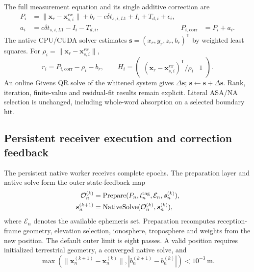 The full measurement equation and its single additive correction are
\begin{align}
 P_i&=\|\boldsymbol x_r-\boldsymbol x_{s,i}^{rx}\|+b_r
       -c\delta t_{s,i,L1}+I_i+T_{d,i}+\epsilon_i,\\
 a_i&=c\delta t_{s,i,L1}-I_i-T_{d,i},
 &P_{i,\mathrm{corr}}&=P_i+a_i.
 \label{eq:live-corrected-code}
\end{align}
The native CPU/CUDA solver estimates
$\boldsymbol s=(x_r,y_r,z_r,b_r)^\mathsf T$ by weighted least squares. For
$\rho_i=\|\boldsymbol x_r-\boldsymbol x_{s,i}^{rx}\|$,
\begin{equation}
 r_i=P_{i,\mathrm{corr}}-\rho_i-b_r,
 \qquad
 H_i=\begin{pmatrix}
 (\boldsymbol x_r-\boldsymbol x_{s,i}^{rx})^\mathsf T/\rho_i&1
 \end{pmatrix}.
\end{equation}
An online Givens QR solve of the whitened system gives $\Delta\boldsymbol s$;
$\boldsymbol s\leftarrow\boldsymbol s+\Delta\boldsymbol s$. Rank, iteration,
finite-value and residual-fit results remain explicit. Literal ASA/NA selection
is unchanged, including whole-word absorption on a selected boundary hit.

\clearpage
\subsection{Persistent receiver execution and correction feedback}
\label{sec:live-outer-loop}

The persistent native worker receives complete epochs. The preparation layer
and native solve form the outer state-feedback map
\begin{align}
 \mathcal O_n^{(k)}&=\operatorname{Prepare}
       (P_n,t_n^{\rm tag},\mathcal E_n,\boldsymbol s_n^{(k)}),\\
 \boldsymbol s_n^{(k+1)}&=\operatorname{NativeSolve}
       (\mathcal O_n^{(k)},\boldsymbol s_n^{(k)}),
 \label{eq:live-outer-feedback}
\end{align}
where $\mathcal E_n$ denotes the available ephemeris set. Preparation recomputes
reception-frame geometry, elevation selection, ionosphere, troposphere and
weights from the new position. The default outer limit is eight passes.
A valid position requires initialized terrestrial geometry, a converged native
solve, and
\begin{equation}
 \max\!\left(
 \|\boldsymbol x_n^{(k+1)}-\boldsymbol x_n^{(k)}\|,
 |b_n^{(k+1)}-b_n^{(k)}|
 \right)<10^{-3}\ \mathrm m.
\end{equation}

